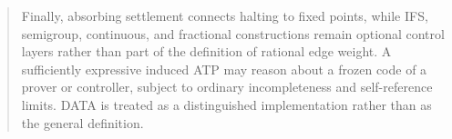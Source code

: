 \documentclass[11pt]{article}
\theoremstyle{remark}
\begin{document}
\begin{abstract}
Finally, absorbing settlement connects halting to fixed points, while IFS, semigroup, continuous, and fractional constructions remain optional control layers rather than part of the definition of rational edge weight. A sufficiently expressive induced ATP may reason about a frozen code of a prover or controller, subject to ordinary incompleteness and self-reference limits. DATA is treated as a distinguished implementation rather than as the general definition.
\end{abstract}

\tableofcontents
\clearpage










\end{document}

